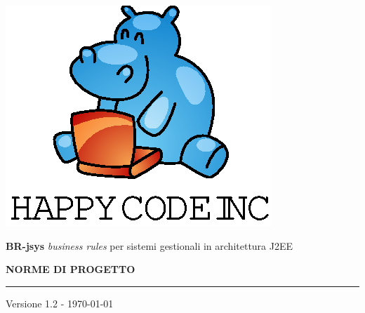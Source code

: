 \documentclass[11pt,titlepage,a4paper]{report}
\begin{document}
\newcommand{\lv}{1.2 } %



\begin{titlepage}
\begin{center}
\vspace*{0.5in}
\includegraphics{logo.eps}
\vspace*{0.2in}

{\Large \textbf{BR-jsys}}
{\Large \emph{business rules} per sistemi gestionali in architettura J2EE } 
\vspace{2in}

\LARGE \textbf {NORME DI PROGETTO}
\par\rule{10cm}{0.4pt} \par {\large Versione \lv - \today}


\end{center}
\end{titlepage}
\vspace*{0.5in}
\end{document}
